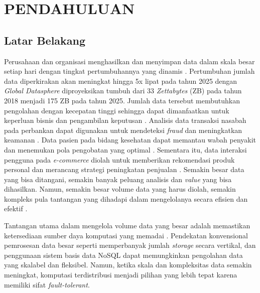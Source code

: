 \chapter{PENDAHULUAN}

\pagestyle{plain}

\section{Latar Belakang}

Perusahaan dan organisasi menghasilkan dan menyimpan data dalam skala besar setiap hari dengan tingkat pertumbuhannya yang dinamis \cite{samadiPerformanceComparisonHadoop2018}. Pertumbuhan jumlah data diperkirakan akan meningkat hingga 5x lipat pada tahun 2025 dengan \textit{Global Datasphere} diproyeksikan tumbuh dari 33 \textit{Zettabytes} (ZB) pada tahun 2018 menjadi 175 ZB \cite{reinselDigitizationWorldEdge2018} pada tahun 2025. Jumlah data tersebut membutuhkan pengolahan dengan kecepatan tinggi sehingga dapat dimanfaatkan untuk keperluan bisnis dan pengambilan keputusan \cite{adrianExpertReviewBig2018}. Analisis data transaksi nasabah pada perbankan dapat digunakan untuk mendeteksi \textit{fraud} dan meningkatkan keamanan \cite{syahputraPendeteksianFraudPeran2020}. Data pasien pada bidang kesehatan dapat memantau wabah penyakit dan menemukan pola pengobatan yang optimal \cite{sulaimanLITERATUREREVIEWPENERAPAN2023}. Sementara itu, data interaksi pengguna pada \textit{e-commerce} diolah untuk memberikan rekomendasi produk personal dan merancang strategi peningkatan penjualan \cite{fernandoUtilizationBigData2020}. Semakin besar data yang bisa ditangani, semakin banyak peluang analisis dan \textit{value} yang bisa dihasilkan. Namun, semakin besar volume data yang harus diolah, semakin kompleks pula tantangan yang dihadapi dalam mengelolanya secara efisien dan efektif \cite{KOMPARASIKECEPATANHADOOP}.


Tantangan utama dalam mengelola volume data yang besar adalah memastikan ketersediaan sumber daya komputasi yang memadai \cite{KOMPARASIKECEPATANHADOOP}. Pendekatan konvensional pemrosesan data besar seperti memperbanyak jumlah \textit{storage} secara vertikal, dan penggunaan sistem basis data NoSQL dapat memungkinkan pengolahan data yang skalabel dan fleksibel. Namun, ketika skala dan kompleksitas data semakin meningkat, komputasi terdistribusi menjadi pilihan yang lebih tepat karena memiliki sifat \textit{fault-tolerant}\cite{saadoonFaultToleranceBig2022}. 


